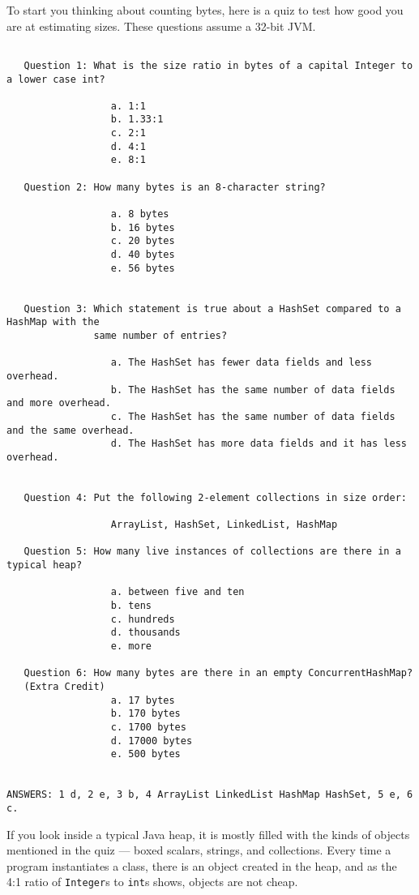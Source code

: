 To start you thinking about counting bytes, here is a quiz to test how good you are at estimating sizes. These questions assume a 32-bit JVM.
\begin{verbatim}

   Question 1: What is the size ratio in bytes of a capital Integer to a lower case int?
   
                  a. 1:1
                  b. 1.33:1
                  c. 2:1
                  d. 4:1
                  e. 8:1
   
   Question 2: How many bytes is an 8-character string?

                  a. 8 bytes
                  b. 16 bytes
                  c. 20 bytes
                  d. 40 bytes
                  e. 56 bytes
 
   
   Question 3: Which statement is true about a HashSet compared to a HashMap with the
               same number of entries?
               
                  a. The HashSet has fewer data fields and less overhead.
                  b. The HashSet has the same number of data fields and more overhead.
                  c. The HashSet has the same number of data fields and the same overhead.
                  d. The HashSet has more data fields and it has less overhead.
                  
                       
   Question 4: Put the following 2-element collections in size order:
    
                  ArrayList, HashSet, LinkedList, HashMap
          
   Question 5: How many live instances of collections are there in a typical heap?
   
                  a. between five and ten
                  b. tens
                  c. hundreds
                  d. thousands
                  e. more

   Question 6: How many bytes are there in an empty ConcurrentHashMap?
   (Extra Credit)
                  a. 17 bytes
                  b. 170 bytes
                  c. 1700 bytes
                  d. 17000 bytes
                  e. 500 bytes
           

ANSWERS: 1 d, 2 e, 3 b, 4 ArrayList LinkedList HashMap HashSet, 5 e, 6 c.                 
\end{verbatim}

If you look inside a typical Java heap, it is mostly filled with the kinds of objects  mentioned in the quiz --- boxed scalars, strings, and collections. Every time a program instantiates a class, there is an object created in the heap, and as the 4:1 ratio of \texttt{Integer}s to \texttt{int}s shows, objects are not cheap. 

